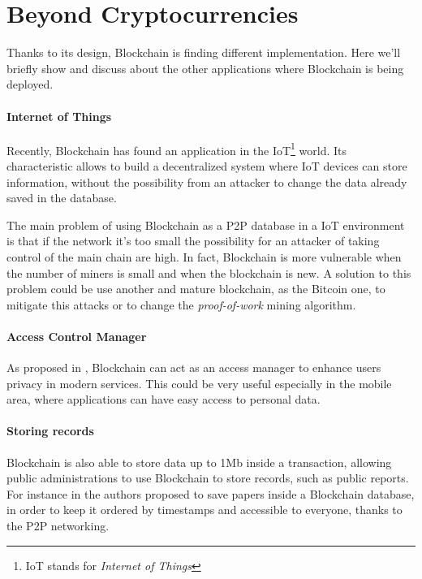 \section{Beyond Cryptocurrencies}

Thanks to its design, Blockchain is finding different implementation. Here
we'll briefly show and discuss about the other applications where Blockchain is
being deployed.

\paragraph*{Internet of Things}

Recently, Blockchain has found an application in the IoT\footnote{IoT stands
for \textit{Internet of Things}} world\cite{politecnico16}. Its characteristic
allows to build a decentralized system where IoT devices can store information,
without the possibility from an attacker to change the data already saved in
the database\cite{politecnico16}.

The main problem of using Blockchain as a P2P database in a IoT environment is
that if the network it's too small the possibility for an attacker of taking
control of the main chain are high. In fact, Blockchain is more vulnerable when
the number of miners is small and when the blockchain is new. A solution to
this problem could be use another and mature blockchain, as the Bitcoin one, to
mitigate this attacks or to change the \textit{proof-of-work} mining algorithm.

\paragraph*{Access Control Manager}

As proposed in \cite{dp15}, Blockchain can act as an access manager to enhance
users privacy in modern services. This could be very useful especially in the
mobile area, where applications can have easy access to personal data.

\paragraph*{Storing records}

Blockchain is also able to store data up to 1Mb \cite{ectel16} inside a
transaction, allowing public administrations to use Blockchain to store
records, such as public reports. For instance in \cite{ectel16} the authors
proposed to save papers inside a Blockchain database, in order to keep it
ordered by timestamps and accessible to everyone, thanks to the P2P networking.
